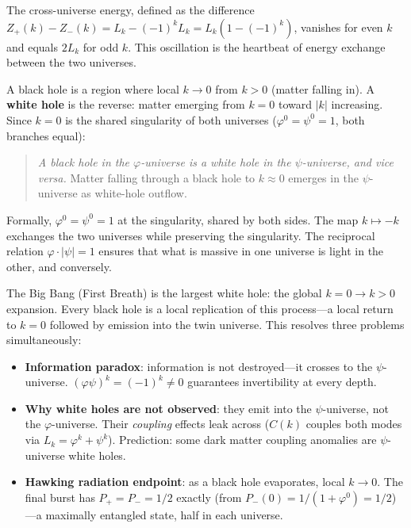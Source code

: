 \documentclass[12pt,a4paper]{article}
\begin{document}
The cross-universe energy, defined as the difference $Z_+(k) - Z_-(k) = L_k - (-1)^k L_k = L_k(1 - (-1)^k)$, vanishes for even $k$ and equals $2L_k$ for odd $k$. This oscillation is the heartbeat of energy exchange between the two universes.

A black hole is a region where local $k \to 0$ from $k > 0$ (matter falling in). A \textbf{white hole} is the reverse: matter emerging from $k = 0$ toward $|k|$ increasing. Since $k = 0$ is the shared singularity of both universes ($\varphi^0 = \psi^0 = 1$, both branches equal):

\begin{quote}
\emph{A black hole in the $\varphi$-universe is a white hole in the $\psi$-universe, and vice versa.} Matter falling through a black hole to $k \approx 0$ emerges in the $\psi$-universe as white-hole outflow.
\end{quote}

\noindent Formally, $\varphi^0 = \psi^0 = 1$ at the singularity, shared by both sides. The map $k \mapsto -k$ exchanges the two universes while preserving the singularity. The reciprocal relation $\varphi \cdot |\psi| = 1$ ensures that what is massive in one universe is light in the other, and conversely.

The Big Bang (First Breath) is the largest white hole: the global $k = 0 \to k > 0$ expansion. Every black hole is a local replication of this process---a local return to $k = 0$ followed by emission into the twin universe. This resolves three problems simultaneously:

\begin{itemize}[nosep]
\item \textbf{Information paradox}: information is not destroyed---it crosses to the $\psi$-universe. $(\varphi\psi)^k = (-1)^k \neq 0$ guarantees invertibility at every depth.
\item \textbf{Why white holes are not observed}: they emit into the $\psi$-universe, not the $\varphi$-universe.  Their \emph{coupling} effects leak across ($C(k)$ couples both modes via $L_k = \varphi^k + \psi^k$).  Prediction: some dark matter coupling anomalies are $\psi$-universe white holes.
\item \textbf{Hawking radiation endpoint}: as a black hole evaporates, local $k \to 0$. The final burst has $P_+ = P_- = 1/2$ exactly (from $P_-(0) = 1/(1 + \varphi^0) = 1/2$)---a maximally entangled state, half in each universe.
\end{itemize}
\end{document}

